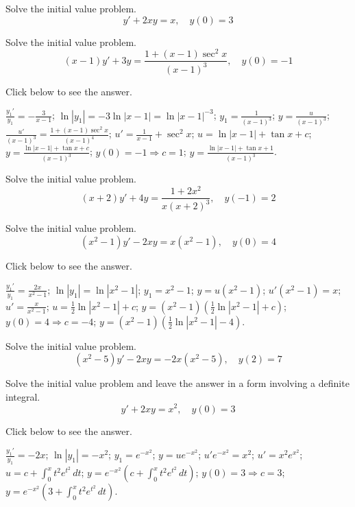 \documentclass{ximera}
\begin{document}
\begin{problem}\label{exer:2.1.33} Solve the initial value problem.
$$y'+2xy=x,\quad y(0)=3$$
\end{problem}

\begin{problem}\label{exer:2.1.34} Solve the initial value problem.
$$(x-1)y'+3y=\frac{1+(x-1)\sec^2x}{(x-1)^3},\quad y(0)=-1$$

Click below to see the answer.

\begin{expandable}
    $\frac{y_1'}{ y_1}=-\frac{3}{ x-1}$;\quad
$\ln|y_1|=-3\ln|x-1|=\ln|x-1|^{-3}$;\quad
$y_1=\frac{1}{(x-1)^3}$;\quad
$y=\frac{u}{(x-1)^3}$;\quad
$\frac{u'}{(x-1)^3}=\frac{1+(x-1)\sec^2x}{(x-1)^4}$;\quad
$u'=\frac{1}{ x-1}+\sec^2x$;\quad
$u=\ln|x-1|+\tan x+c$;\quad
$y=\frac{\ln|x-1|+\tan x+c}{(x-1)^3}$;\quad
$y(0)=-1\Rightarrow c=1$;\quad
$y=\frac{\ln|x-1|+\tan
x+1}{(x-1)^3}$.
\end{expandable}
\end{problem}

\begin{problem}\label{exer:2.1.35} Solve the initial value problem.
$$(x+2)y'+4y=\frac{1+2x^2}{x(x+2)^3},\quad y(-1)=2$$
\end{problem}

\begin{problem}\label{exer:2.1.36} Solve the initial value problem.
$$(x^2-1)y'-2xy=x(x^2-1),\quad y(0)=4$$

Click below to see the answer.

\begin{expandable}
    $\frac{y_1'}{ y_1}=\frac{2x}{ x^2-1}$;\quad
$\ln|y_1|=\ln|x^2-1|$;\quad
$y_1=x^2-1$;\quad
$y=u(x^2-1)$;\quad
$u'(x^2-1)=x$;\quad
$u'=\frac{x}{ x^2-1}$;\quad
$u=\frac{1}{2}\ln|x^2-1|+c$;\quad
$y=(x^2-1)\left(\frac{1}{2}\ln|x^2-1|+c\right)$;\quad
$y(0)=4\Rightarrow c=-4$;\quad
$y=(x^2-1)\left(\frac{1}{2}\ln|x^2-1|-4\right)$.
\end{expandable}
\end{problem}

\begin{problem}\label{exer:2.1.37} Solve the initial value problem.
$$(x^2-5)y'-2xy=-2x(x^2-5),\quad y(2)=7$$
\end{problem}

\begin{problem}\label{exer:2.1.38} Solve the initial value problem and leave the answer in a form involving a definite integral.
$$y'+2xy=x^2,\quad y(0)=3$$

Click below to see the answer.

\begin{expandable}
    $\frac{y_1'}{ y_1}=-2x$;\quad
$\ln|y_1|=-x^2$;\quad
$y_1=e^{-x^2}$;\quad
$y=ue^{-x^2}$;\quad
$u'e^{-x^2}=x^2$;\quad
$u'=x^2e^{x^2}$;\quad
$u=c+{\int_0^xt^2e^{t^2}\,dt}$;\quad
$y=e^{-x^2}\left(c+{\int_0^xt^2e^{t^2}\,dt}\right)$;\quad
$y(0)=3\Rightarrow c=3$;\quad
$y=e^{-x^2}\left(3+{\int_0^xt^2e^{t^2}\,dt}\right)$.

\end{expandable}
\end{problem}
\end{document}
